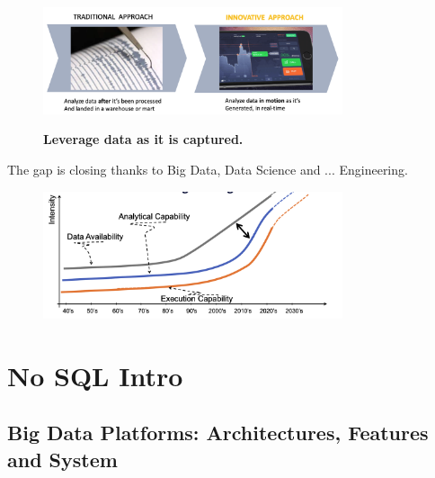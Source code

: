 \documentclass[10pt,a4paper]{article}
\begin{document}
\begin{figure}[h!]
 \hfill \includegraphics[width=250pt]{images/new-44.png}\hspace*{\fill}
  \label{fig:new44}
  \caption{\textbf{Leverage data as it is captured.}}
  \end{figure}
  The gap is closing thanks to Big Data, Data Science and ... Engineering.
  \begin{figure}[h!]
 \hfill \includegraphics[width=250pt]{images/data-engineering-era.png}\hspace*{\fill}
  \label{fig:data-eng-era}
\end{figure}
\pagebreak
\section{No SQL Intro}
\subsection{Big Data Platforms: Architectures, Features and System}
\end{document}
